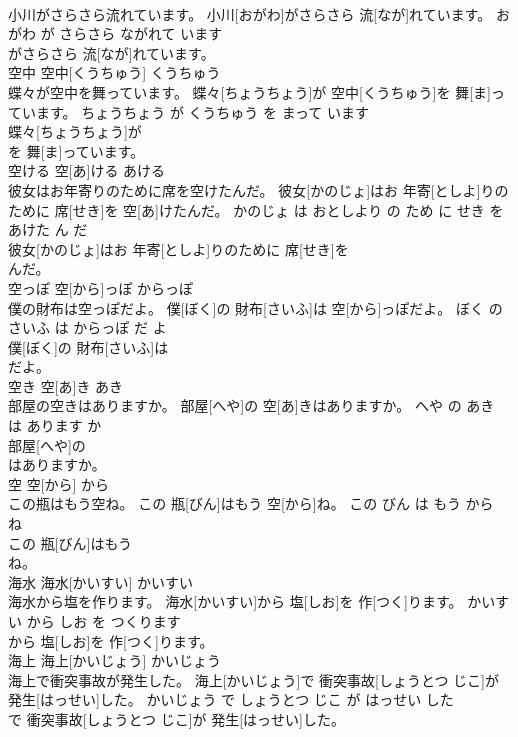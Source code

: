 \documentclass[8pt]{extreport}
\begin{document}
\begin{CJK}{UTF8}{min}
\\	小川がさらさら流れています。	小川[おがわ]がさらさら 流[なが]れています。	おがわ が さらさら ながれて います	
\\	がさらさら 流[なが]れています。			
\\	空中	空中[くうちゅう]	くうちゅう	
\\	蝶々が空中を舞っています。	蝶々[ちょうちょう]が 空中[くうちゅう]を 舞[ま]っています。	ちょうちょう が くうちゅう を まって います	
\\	蝶々[ちょうちょう]が
\\	を 舞[ま]っています。			
\\	空ける	空[あ]ける	あける	
\\	彼女はお年寄りのために席を空けたんだ。	彼女[かのじょ]はお 年寄[としよ]りのために 席[せき]を 空[あ]けたんだ。	かのじょ は おとしより の ため に せき を あけた ん だ	
\\	彼女[かのじょ]はお 年寄[としよ]りのために 席[せき]を
\\	んだ。			
\\	空っぽ	空[から]っぽ	からっぽ	
\\	僕の財布は空っぽだよ。	僕[ぼく]の 財布[さいふ]は 空[から]っぽだよ。	ぼく の さいふ は からっぽ だ よ	
\\	僕[ぼく]の 財布[さいふ]は
\\	だよ。			
\\	空き	空[あ]き	あき	
\\	部屋の空きはありますか。	部屋[へや]の 空[あ]きはありますか。	へや の あき は あります か	
\\	部屋[へや]の
\\	はありますか。			
\\	空	空[から]	から	
\\	この瓶はもう空ね。	この 瓶[びん]はもう 空[から]ね。	この びん は もう から ね	
\\	この 瓶[びん]はもう
\\	ね。			
\\	海水	海水[かいすい]	かいすい	
\\	海水から塩を作ります。	海水[かいすい]から 塩[しお]を 作[つく]ります。	かいすい から しお を つくります	
\\	から 塩[しお]を 作[つく]ります。			
\\	海上	海上[かいじょう]	かいじょう	
\\	海上で衝突事故が発生した。	海上[かいじょう]で 衝突事故[しょうとつ じこ]が 発生[はっせい]した。	かいじょう で しょうとつ じこ が はっせい した	
\\	で 衝突事故[しょうとつ じこ]が 発生[はっせい]した。			

\end{CJK}
\end{document}
